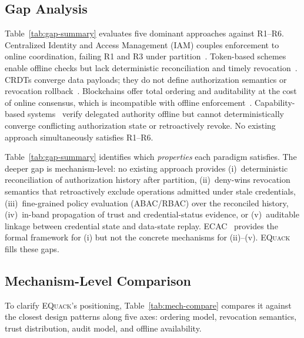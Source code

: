 \documentclass[10pt,journal,compsoc]{IEEEtran}
\newcommand{\equack}{\textsc{EQuack}}
\begin{document}
\subsection{Gap Analysis}\label{subsec:gap-analysis}

Table~\ref{tab:gap-summary} evaluates five dominant approaches against R1--R6. Centralized Identity and Access Management (IAM) couples enforcement to online coordination, failing R1 and R3 under partition~\cite{jacob2024eventuallyac}. Token-based schemes enable offline checks but lack deterministic reconciliation and timely revocation~\cite{rouhani2021distributed}. CRDTs converge data payloads; they do not define authorization semantics or revocation rollback~\cite{shapiro2011crdt,gomes2017_sec}. Blockchains offer total ordering and auditability at the cost of online consensus, which is incompatible with offline enforcement~\cite{8989788,9020182,9446108,8798730,9548956,DIFRANCESCOMAESA201993,s20010282,s22031271}. Capability-based systems~\cite{birgisson2014macaroons,ucan2022,andersen2019wave} verify delegated authority offline but cannot deterministically converge conflicting authorization state or retroactively revoke. No existing approach simultaneously satisfies R1--R6.

Table~\ref{tab:gap-summary} identifies which \emph{properties}
each paradigm satisfies. The deeper gap is mechanism-level: no
existing approach provides
(i)~deterministic reconciliation of authorization history after
    partition,
(ii)~deny-wins revocation semantics that retroactively exclude
    operations admitted under stale credentials,
(iii)~fine-grained policy evaluation (ABAC/RBAC) over the
    reconciled history,
(iv)~in-band propagation of trust and credential-status evidence,
    or
(v)~auditable linkage between credential state and data-state
    replay.
ECAC~\cite{jacob2024eventuallyac} provides the formal framework
for (i) but not the concrete mechanisms for (ii)--(v). \equack{}
fills these gaps.

\subsection{Mechanism-Level Comparison}\label{subsec:mechanism-comparison}

To clarify \equack{}'s positioning, Table~\ref{tab:mech-compare} compares it against the closest design patterns along five axes: ordering model, revocation semantics, trust distribution, audit model, and offline availability.
\end{document}
